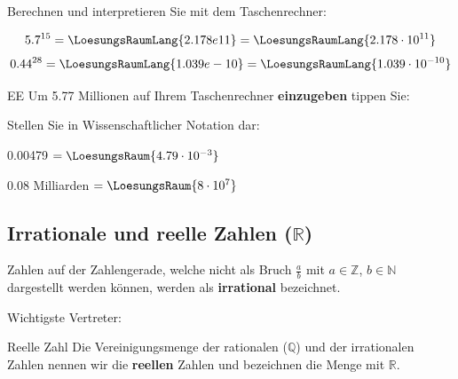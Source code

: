 Berechnen und interpretieren Sie mit dem Taschenrechner:

$$5.7^{15} = \LoesungsRaumLang{2.178e11} = \LoesungsRaumLang{2.178 \cdot{} 10^{11}}$$
$$0.44^{28} =\LoesungsRaumLang{1.039e-10} = \LoesungsRaumLang{1.039\cdot{} 10^{-10}}$$
\begin{rezept}{EE}{}
    Um 5.77 Millionen auf Ihrem Taschenrechner \textbf{einzugeben} tippen Sie:

\begin{center}  \noTRAINER{\vspace{5mm}} \end{center}

\end{rezept}

Stellen Sie in Wissenschaftlicher Notation dar:

0.00479 $= \LoesungsRaum{4.79 \cdot{}10^{-3}}$

0.08 Milliarden $= \LoesungsRaum{8\cdot{}10^7}$

\newpage

\subsection{Irrationale und reelle Zahlen ($\mathbb{R}$)}

  Zahlen auf der Zahlengerade, welche nicht als Bruch $\frac{a}{b}$ mit $a\in\mathbb{Z}$, $b \in \mathbb{N}$ dargestellt werden können, werden als \textbf{irrational} bezeichnet.

Wichtigste Vertreter:


\begin{definition}{Reelle Zahl}{}
Die Vereinigungsmenge der rationalen ($\mathbb{Q}$) und der irrationalen Zahlen
nennen wir die \textbf{reellen} Zahlen und bezeichnen die Menge mit $\mathbb{R}$.
\end{definition}


